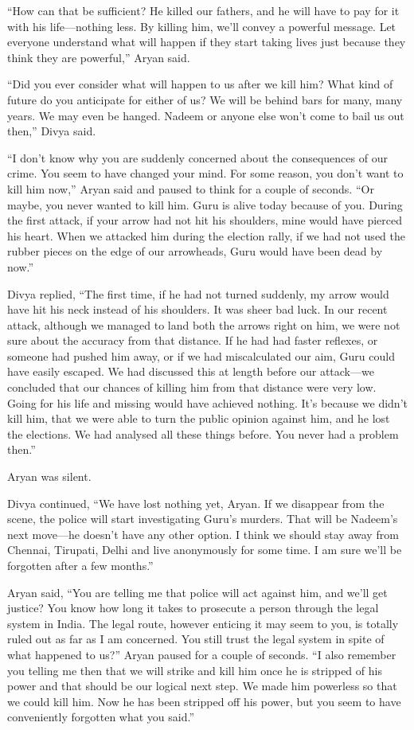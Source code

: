“How can that be sufficient? He killed our fathers, and he will have to pay for
it with his life—nothing less. By killing him, we'll convey a powerful message.
Let everyone understand what will happen if they start taking lives just because
they think they are powerful,” Aryan said.

“Did you ever consider what will happen to us after we kill him? What kind of
future do you anticipate for either of us? We will be behind bars for many, many
years. We may even be hanged. Nadeem or anyone else won't come to bail us out
then,” Divya said.

“I don't know why you are suddenly concerned about the consequences of our
crime. You seem to have changed your mind. For some reason, you don't want to
kill him now,” Aryan said and paused to think for a couple of seconds. “Or
maybe, you never wanted to kill him. Guru is alive today because of you. During
the first attack, if your arrow had not hit his shoulders, mine would have
pierced his heart. When we attacked him during the election rally, if we had not
used the rubber pieces on the edge of our arrowheads, Guru would have been dead
by now.”

Divya replied, “The first time, if he had not turned suddenly, my arrow would
have hit his neck instead of his shoulders. It was sheer bad luck. In our recent
attack, although we managed to land both the arrows right on him, we were not
sure about the accuracy from that distance. If he had had faster reflexes, or someone
had pushed him away, or if we had miscalculated our aim, Guru could have easily
escaped. We had discussed this at length before our attack—we concluded
that our chances of killing him from that distance were very low. Going for his
life and missing would have achieved nothing. It's because we didn't kill him, that
we were able to turn the public opinion against him, and he lost the elections.
We had analysed all these things before. You never had a problem then.”

Aryan was silent.

Divya continued, “We have lost nothing yet, Aryan. If we disappear from the
scene, the police will start investigating Guru's murders. That will be Nadeem's
next move—he doesn't have any other option. I think we should stay away from
Chennai, Tirupati, Delhi and live anonymously for some time. I am sure we'll be
forgotten after a few months.”

Aryan said, “You are telling me that police will act against him, and we'll get
justice? You know how long it takes to prosecute a person through the legal
system in India. The legal route, however enticing it may seem to you,
is totally ruled out as far as I am concerned. You still trust the legal system
in spite of what happened to us?” Aryan paused for a couple of seconds. “I also
remember you telling me then that we will strike and kill him once he is
stripped of his power and that should be our logical next step. We made him
powerless so that we could kill him. Now he has been stripped off his power, but
you seem to have conveniently forgotten what you said.”


